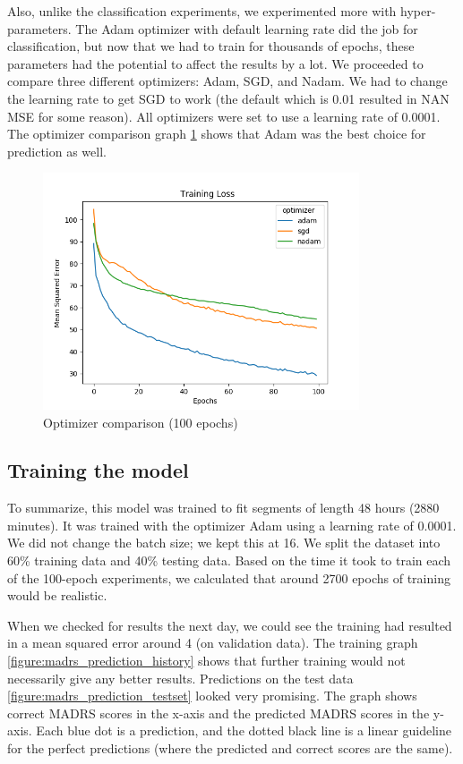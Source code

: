 Also, unlike the classification experiments, we experimented more with hyper-parameters. The Adam optimizer with default learning rate did the job for classification, 
but now that we had to train for thousands of epochs, these parameters had the potential to affect the results by a lot. 
We proceeded to compare three different optimizers: Adam, SGD, and Nadam. We had to change the learning rate to get SGD to work 
(the default which is 0.01 \cite{keras_docs_optimizers} resulted in NAN MSE for some reason). All optimizers were set to use a learning rate of 0.0001. 
The optimizer comparison graph \ref{figure:madrs_prediction_optimizers} shows that Adam was the best choice for prediction as well. 

\begin{figure}
\begin{center}
      \includegraphics[height=7cm]{img/madrs_prediction/optimizers.png}
      \caption{Optimizer comparison (100 epochs)}
      \label{figure:madrs_prediction_optimizers}
\end{center}
\end{figure}

\subsection{Training the model}
To summarize, this model was trained to fit segments of length 48 hours (2880 minutes). It was trained with the optimizer Adam using a learning rate of 0.0001. We did not change the batch size; we kept this at 16. We split the dataset into 60\% training data and 40\% testing data. Based on the time it took to train each of the 100-epoch experiments, we calculated that around 2700 epochs of training would be realistic.

When we checked for results the next day, we could see the training had resulted in a mean squared error around 4 (on validation data). The training graph \ref{figure:madrs_prediction_history} shows that further training would not necessarily give any better results. Predictions on the test data \ref{figure:madrs_prediction_testset} looked very promising. The graph shows correct MADRS scores in the x-axis and the predicted MADRS scores in the y-axis. Each blue dot is a prediction, and the dotted black line is a linear guideline for the perfect predictions (where the predicted and correct scores are the same). 

